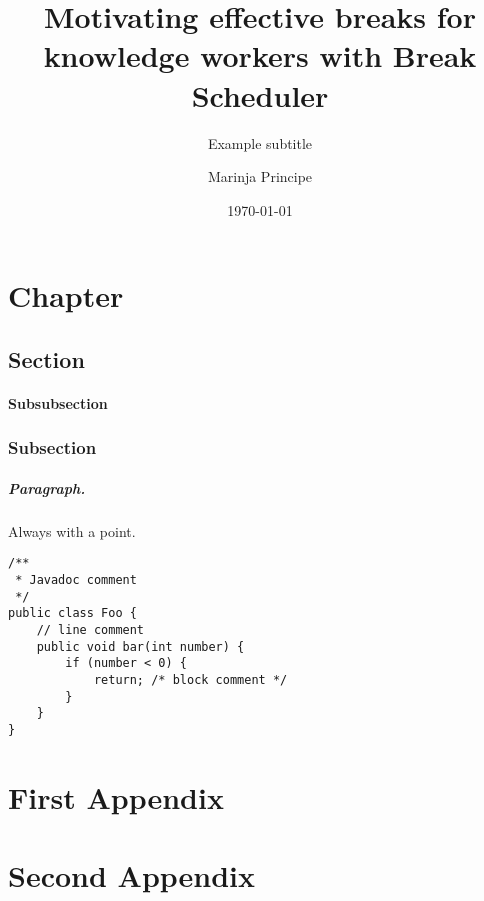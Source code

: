 \documentclass{hasel_thesis}
\date{\today}
\title{Motivating effective breaks for knowledge workers with Break  Scheduler }
\subtitle{Example subtitle}
\author{Marinja Principe}
\begin{document}
\maketitle

\frontmatter

\begin{acknowledgements}
\end{acknowledgements}

\begin{abstract}
\end{abstract}

\begin{zusammenfassung}
\end{zusammenfassung}

\tableofcontents
\listoffigures
\listoftables
\lstlistoflistings

\mainmatter
\chapter{Chapter}
\section{Section}
%
\subsubsection{Subsubsection}

\subsection{Subsection}
%
\paragraph{Paragraph.} Always with a point.

\begin{lstlisting}[caption=An example code snippet]
/**
 * Javadoc comment
 */
public class Foo {
	// line comment
	public void bar(int number) {
		if (number < 0) {
			return; /* block comment */
		}
	}
}
\end{lstlisting}

\appendix
\chapter{First Appendix}
\chapter{Second Appendix}

\backmatter


\end{document}
